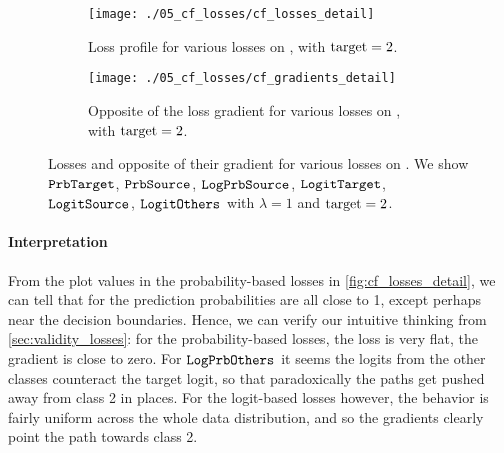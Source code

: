 \documentclass[../main.tex]{subfiles}
\begin{document}


\begin{figure}[htbp]
    \centering
    \begin{subfigure}[b]{\textwidth}
        \centering
        \texttt{[image: ./05\_cf\_losses/cf\_losses\_detail]}
        \caption{Loss profile for various losses on \CakeOnSea, with ${\mathrm{target} = 2}$.}
        \label{fig:cf_losses_detail}
    \end{subfigure}

    \vspace*{\floatsep}%

    \begin{subfigure}[b]{\textwidth}
        \centering
        \texttt{[image: ./05\_cf\_losses/cf\_gradients\_detail]}
        \caption{Opposite of the loss gradient for various losses on \CakeOnSea, with ${\mathrm{target} = 2}$.}
        \label{fig:cf_gradients_detail}
    \end{subfigure}

    \caption{Losses and opposite of their gradient for various losses on \CakeOnSea.
    We show $\mathtt{PrbTarget}{}$, $\mathtt{PrbSource}_{}$, $\mathtt{LogPrbSource}_{}$, $\mathtt{LogitTarget}{}$, $\mathtt{LogitSource}_{}$, $\mathtt{LogitOthers}_{}$
     with $\lambda =1$ and $\mathrm{target} = 2$.}
\end{figure}

\paragraph{Interpretation}

From the plot values in the probability-based losses in \autoref{fig:cf_losses_detail}, we can tell that for \CakeOnSea{} the prediction probabilities are all close to 1, except perhaps near the decision boundaries.
Hence, we can verify our intuitive thinking from \autoref{sec:validity_losses}: for the probability-based losses, the loss is very flat, \ie{} the gradient is close to zero.
For $\mathtt{LogPrbOthers}_{}$ it seems the logits from the other classes counteract the target logit, so that paradoxically the paths get pushed away from class 2 in places.
For the logit-based losses however, the behavior is fairly uniform across the whole data distribution, and so the gradients clearly point the path towards class 2.
\end{document}
